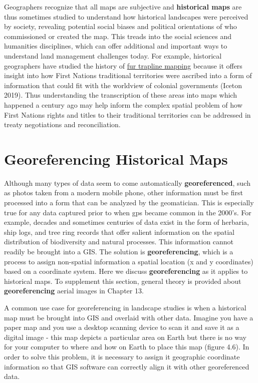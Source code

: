 \documentclass[
]{book}
\begin{document}
Geographers recognize that all maps are subjective and \textbf{historical maps} are thus sometimes studied to understand how historical landscapes were perceived by society, revealing potential social biases and political orientations of who commissioned or created the map. This treads into the social sciences and humanities disciplines, which can offer additional and important ways to understand land management challenges today. For example, historical geographers have studied the history of \href{https://catalogue.data.gov.bc.ca/dataset/traplines-of-british-columbia}{fur trapline mapping} because it offers insight into how First Nations traditional territories were ascribed into a form of information that could fit with the worldview of colonial governments (Iceton 2019). Thus understanding the transcription of these areas into maps which happened a century ago may help inform the complex spatial problem of how First Nations rights and titles to their traditional territories can be addressed in treaty negotiations and reconciliation.

\hypertarget{georeferencing-historical-maps}{%
\section{Georeferencing Historical Maps}\label{georeferencing-historical-maps}}

Although many types of data seem to come automatically \textbf{georeferenced}, such as photos taken from a modern mobile phone, other information must be first processed into a form that can be analyzed by the geomatician. This is especially true for any data captured prior to when gps became common in the 2000's. For example, decades and sometimes centuries of data exist in the form of herbaria, ship logs, and tree ring records that offer salient information on the spatial distribution of biodiversity and natural processes. This information cannot readily be brought into a GIS. The solution is \textbf{georeferencing}, which is a process to assign non-spatial information a spatial location (x and y coordinates) based on a coordinate system. Here we discuss \textbf{georeferencing} as it applies to historical maps. To supplement this section, general theory is provided about \textbf{georeferencing} aerial images in Chapter 13.

A common use case for georeferencing in landscape studies is when a historical map must be brought into GIS and overlaid with other data. Imagine you have a paper map and you use a desktop scanning device to scan it and save it as a digital image - this map depicts a particular area on Earth but there is no way for your computer to where and how on Earth to place this map (figure 4.6). In order to solve this problem, it is necessary to assign it geographic coordinate information so that GIS software can correctly align it with other georeferenced data.
\end{document}
